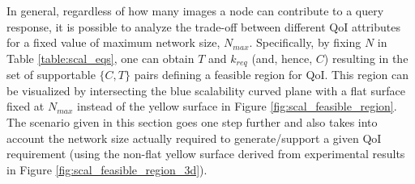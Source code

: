 In general, regardless of how many images a node can contribute to a query response, it is possible to analyze the trade-off between different QoI attributes for a fixed value of maximum network size, $N_{max}$.  Specifically, by fixing $N$ in Table \ref{table:scal_eqs}, one can obtain $T$ and $k_{req}$ (and, hence, $C$) resulting in the set of supportable $\{C,T\}$ pairs defining a feasible region for QoI. This region can be visualized by intersecting the blue scalability curved plane with a flat surface fixed at $N_{max}$ instead of the yellow surface in Figure \ref{fig:scal_feasible_region}.  The scenario given in this section goes one step further and also takes into account  the network size actually required to generate/support a given QoI requirement (using the non-flat yellow surface derived from experimental results in Figure \ref{fig:scal_feasible_region_3d}).
